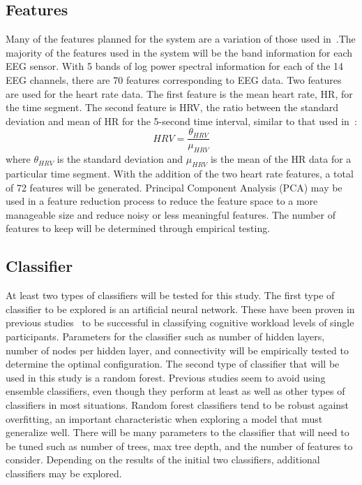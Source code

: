 \documentclass[11pt]{article}
\begin{document}
\subsection{Features}
Many of the features planned for the system are a variation of those used in~\cite{Wilson}.The majority of the features used in the system will be the band information for each EEG sensor. With 5 bands of log power spectral information for each of the 14 EEG channels, there are 70 features corresponding to EEG data. Two features are used for the heart rate data. The first feature is the mean heart rate, HR, for the time segment. The second feature is HRV, the ratio between the standard deviation and mean of HR for the 5-second time interval, similar to that used in~\cite{Zhang}: \[HRV = \frac{\theta_{HRV}}{\mu_{HRV}}\] where \( \theta_{HRV} \) is the standard deviation and \( \mu_{HRV}\) is the mean of the HR data for a particular time segment. With the addition of the two heart rate features, a total of 72 features will be generated. Principal Component Analysis (PCA) may be used in a feature reduction process to reduce the feature space to a more manageable size and reduce noisy or less meaningful features. The number of features to keep will be determined through empirical testing.

\subsection{Classifier}
At least two types of classifiers will be tested for this study.  The first type of classifier to be explored is an artificial neural network. These have been proven in previous studies~\cite{Wilson} to be successful in classifying cognitive workload levels of single participants. Parameters for the classifier such as number of hidden layers, number of nodes per hidden layer, and connectivity will be empirically tested to determine the optimal configuration. The second type of classifier that will be used in this study is a random forest. Previous studies seem to avoid using ensemble classifiers, even though they perform at least as well as other types of classifiers in most situations. Random forest classifiers tend to be robust against overfitting, an important characteristic when exploring a model that must generalize well. There will be many parameters to the classifier that will need to be tuned such as number of trees, max tree depth, and the number of features to consider. Depending on the results of the initial two classifiers, additional classifiers may be explored.  
\end{document}
